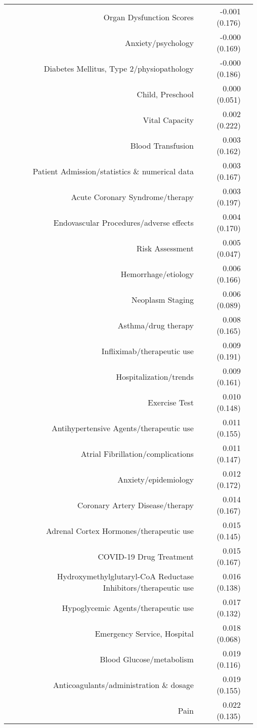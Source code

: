 \begin{longtable}[l]{rr@{}l@{ }}
Organ Dysfunction Scores & -0.001 (0.176) & $^{}$\\
Anxiety/psychology & -0.000 (0.169) & $^{}$\\
Diabetes Mellitus, Type 2/physiopathology & -0.000 (0.186) & $^{}$\\
Child, Preschool & 0.000 (0.051) & $^{}$\\
Vital Capacity & 0.002 (0.222) & $^{}$\\
Blood Transfusion & 0.003 (0.162) & $^{}$\\
Patient Admission/statistics \& numerical data & 0.003 (0.167) & $^{}$\\
Acute Coronary Syndrome/therapy & 0.003 (0.197) & $^{}$\\
Endovascular Procedures/adverse effects & 0.004 (0.170) & $^{}$\\
Risk Assessment & 0.005 (0.047) & $^{}$\\
Hemorrhage/etiology & 0.006 (0.166) & $^{}$\\
Neoplasm Staging & 0.006 (0.089) & $^{}$\\
Asthma/drug therapy & 0.008 (0.165) & $^{}$\\
Infliximab/therapeutic use & 0.009 (0.191) & $^{}$\\
Hospitalization/trends & 0.009 (0.161) & $^{}$\\
Exercise Test & 0.010 (0.148) & $^{}$\\
Antihypertensive Agents/therapeutic use & 0.011 (0.155) & $^{}$\\
Atrial Fibrillation/complications & 0.011 (0.147) & $^{}$\\
Anxiety/epidemiology & 0.012 (0.172) & $^{}$\\
Coronary Artery Disease/therapy & 0.014 (0.167) & $^{}$\\
Adrenal Cortex Hormones/therapeutic use & 0.015 (0.145) & $^{}$\\
COVID-19 Drug Treatment & 0.015 (0.167) & $^{}$\\
Hydroxymethylglutaryl-CoA Reductase Inhibitors/therapeutic use & 0.016 (0.138) & $^{}$\\
Hypoglycemic Agents/therapeutic use & 0.017 (0.132) & $^{}$\\
Emergency Service, Hospital & 0.018 (0.068) & $^{}$\\
Blood Glucose/metabolism & 0.019 (0.116) & $^{}$\\
Anticoagulants/administration \& dosage & 0.019 (0.155) & $^{}$\\
Pain & 0.022 (0.135) & $^{}$\\

\end{longtable}
